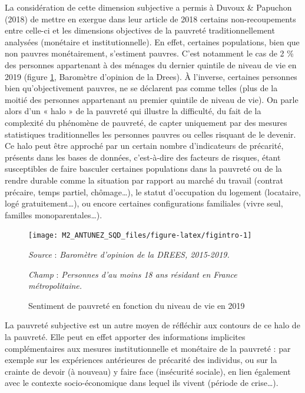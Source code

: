 \documentclass[12pt,a4paper]{reedthesis}
\begin{document}
La considération de cette dimension subjective a permis à Duvoux \& Papuchon (2018) de mettre en exergue dans leur article de 2018 certains non-recoupements entre celle-ci et les dimensions objectives de la pauvreté traditionnellement analysées (monétaire et institutionnelle). En effet, certaines populations, bien que non pauvres monétairement, s'estiment pauvres. C'est notamment le cas de 2 \% des personnes appartenant à des ménages du dernier quintile de niveau de vie en 2019 (figure \ref{fig:figintro}, Baromètre d'opinion de la Drees). À l'inverse, certaines personnes bien qu'objectivement pauvres, ne se déclarent pas comme telles (plus de la moitié des personnes appartenant au premier quintile de niveau de vie). On parle alors d'un « halo » de la pauvreté qui illustre la difficulté, du fait de la complexité du phénomène de pauvreté, de capter uniquement par des mesures statistiques traditionnelles les personnes pauvres ou celles risquant de le devenir. Ce halo peut être approché par un certain nombre d'indicateurs de précarité, présents dans les bases de données, c'est-à-dire des facteurs de risques, étant susceptibles de faire basculer certaines populations dans la pauvreté ou de la rendre durable comme la situation par rapport au marché du travail (contrat précaire, temps partiel, chômage\ldots), le statut d'occupation du logement (locataire, logé gratuitement\ldots), ou encore certaines configurations familiales (vivre seul, familles monoparentales\ldots).
\begin{figure}[!ht]

{\centering \texttt{[image: M2\_ANTUNEZ\_SQD\_files/figure-latex/figintro-1]} 

}

\caption[Sentiment de pauvreté en fonction du niveau de vie en 2019]{Sentiment de pauvreté en fonction du niveau de vie en 2019}\label{fig:figintro}

\footnotesize


\emph{Source} : \emph{Baromètre d’opinion de la DREES, 2015-2019.}


\emph{Champ} : \emph{Personnes d’au moins 18 ans résidant en France métropolitaine.}
\normalsize\end{figure}

La pauvreté subjective est un autre moyen de réfléchir aux contours de ce halo de la pauvreté. Elle peut en effet apporter des informations implicites complémentaires aux mesures institutionnelle et monétaire de la pauvreté : par exemple sur les expériences antérieures de précarité des individus, ou sur la crainte de devoir (à nouveau) y faire face (insécurité sociale), en lien également avec le contexte socio-économique dans lequel ils vivent (période de crise\ldots).
\end{document}
